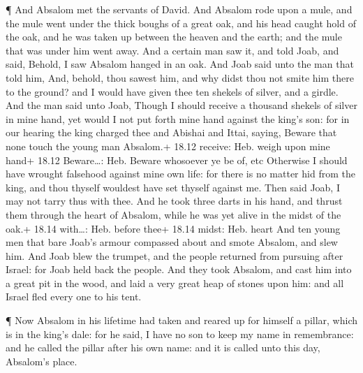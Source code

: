  ¶ And Absalom met the servants of David. And Absalom rode
upon a mule, and the mule went under the thick boughs of a great oak,
and his head caught hold of the oak, and he was taken up between the
heaven and the earth; and the mule that was under him went away.
 And a certain man saw it, and told Joab, and said, Behold,
I saw Absalom hanged in an oak.  And Joab said unto the man
that told him, And, behold, thou sawest him, and why didst thou not
smite him there to the ground? and I would have given thee ten shekels
of silver, and a girdle.  And the man said unto Joab,
Though I should receive a thousand shekels of silver in mine hand, yet
would I not put forth mine hand against the king's son: for in our
hearing the king charged thee and Abishai and Ittai, saying, Beware that
none touch the young man Absalom.+ 18.12 receive: Heb. weigh upon mine
hand+ 18.12 Beware\ldots: Heb. Beware whosoever ye be of, etc
 Otherwise I should have wrought falsehood against mine own
life: for there is no matter hid from the king, and thou thyself
wouldest have set thyself against me.  Then said Joab, I
may not tarry thus with thee. And he took three darts in his hand, and
thrust them through the heart of Absalom, while he was yet alive in the
midst of the oak.+ 18.14 with\ldots: Heb. before thee+ 18.14 midst: Heb.
heart  And ten young men that bare Joab's armour compassed
about and smote Absalom, and slew him.  And Joab blew the
trumpet, and the people returned from pursuing after Israel: for Joab
held back the people.  And they took Absalom, and cast him
into a great pit in the wood, and laid a very great heap of stones upon
him: and all Israel fled every one to his tent.

 ¶ Now Absalom in his lifetime had taken and reared up for
himself a pillar, which is in the king's dale: for he said, I have no
son to keep my name in remembrance: and he called the pillar after his
own name: and it is called unto this day, Absalom's place.

